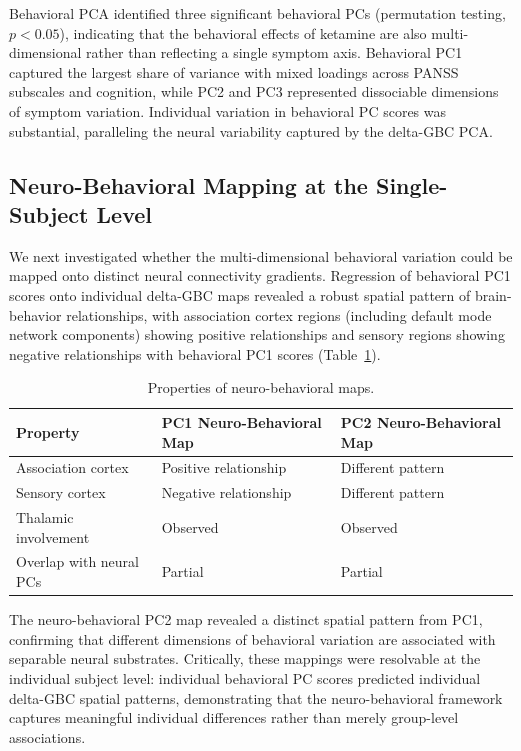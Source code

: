 \documentclass[12pt]{article}
\begin{document}
Behavioral PCA identified three significant behavioral PCs (permutation testing, $p < 0.05$), indicating that the behavioral effects of ketamine are also multi-dimensional rather than reflecting a single symptom axis. Behavioral PC1 captured the largest share of variance with mixed loadings across PANSS subscales and cognition, while PC2 and PC3 represented dissociable dimensions of symptom variation. Individual variation in behavioral PC scores was substantial, paralleling the neural variability captured by the delta-GBC PCA.

\subsection{Neuro-Behavioral Mapping at the Single-Subject Level}

We next investigated whether the multi-dimensional behavioral variation could be mapped onto distinct neural connectivity gradients. Regression of behavioral PC1 scores onto individual delta-GBC maps revealed a robust spatial pattern of brain-behavior relationships, with association cortex regions (including default mode network components) showing positive relationships and sensory regions showing negative relationships with behavioral PC1 scores (Table~\ref{tab:neurobehavioral}).

\begin{table}[ht]
\centering
\caption{Properties of neuro-behavioral maps.}
\label{tab:neurobehavioral}
\begin{tabular}{lll}
\toprule
Property & PC1 Neuro-Behavioral Map & PC2 Neuro-Behavioral Map \\
\midrule
Association cortex & Positive relationship & Different pattern \\
Sensory cortex & Negative relationship & Different pattern \\
Thalamic involvement & Observed & Observed \\
Overlap with neural PCs & Partial & Partial \\
\bottomrule
\end{tabular}
\end{table}

The neuro-behavioral PC2 map revealed a distinct spatial pattern from PC1, confirming that different dimensions of behavioral variation are associated with separable neural substrates. Critically, these mappings were resolvable at the individual subject level: individual behavioral PC scores predicted individual delta-GBC spatial patterns, demonstrating that the neuro-behavioral framework captures meaningful individual differences rather than merely group-level associations.
\end{document}

